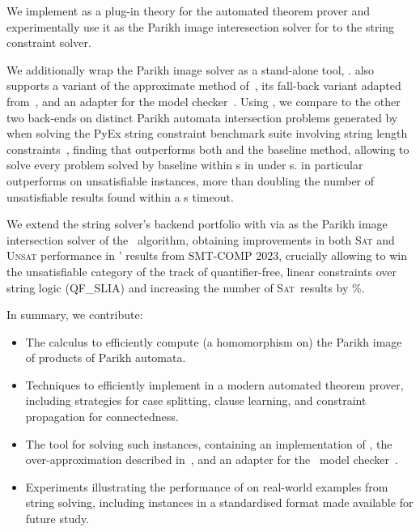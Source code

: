 We implement \Calculus{} as a plug-in theory for the \Princess{} automated
theorem prover and experimentally use it as the Parikh image interesection solver for
to the \Ostrich{} string constraint solver.

We additionally wrap the Parikh image solver as a stand-alone tool, \Catra{}.
\Catra{} also supports a variant of the approximate method of~\cite{approximate-parikh}, its fall-back variant adapted
from~\cite{generate-parikh-image}, and an adapter for the \Nuxmv{} model
checker~\cite{nuxmv}. Using \Catra, we compare \Calculus{} to the other two
back-ends on \NrBenchmarks{} distinct Parikh automata intersection problems
generated by \OstrichPlus{} when solving the PyEx string constraint benchmark
suite involving string length constraints~\cite{pyex}, finding that \Calculus{}
outperforms both \Nuxmv{} and the baseline method, allowing \Calculus{}
to solve every problem solved by baseline within s in under s.
\Calculus{} in particular outperforms \Nuxmv{} on unsatisfiable instances, more than 
doubling the number of unsatisfiable results found within a s timeout.

We extend the \Ostrich{} string solver's backend portfolio with \Calculus{} via
\Catra{} as the Parikh image intersection solver of the \OstrichPlus{}~algorithm,
obtaining improvements in both \textsc{Sat}  and \textsc{Unsat} performance in
\Ostrich{}' results from SMT-COMP 2023, crucially allowing \Ostrich{} to win
the unsatisfiable category of the track of quantifier-free, linear constraints
over string logic (QF\_SLIA) and increasing the number of \textsc{Sat}~results
by \%.



In summary, we contribute:
\begin{itemize}
    \item The \Calculus{} calculus to efficiently compute (a homomorphism on)
          the Parikh image of products of Parikh automata.
    \item Techniques to efficiently implement \Calculus{} in a modern
    automated theorem prover, including strategies for case splitting, clause
    learning, and constraint propagation for connectedness.
    \item The \Catra{} tool for solving such instances, containing an
    implementation of \Calculus{}, the over-approximation described
    in~\cite{approximate-parikh}, and an adapter for the~\Nuxmv{} model
    checker~\cite{nuxmv}.
    \item Experiments illustrating the performance of \Calculus{} on real-world
    examples from string solving, including \NrBenchmarks{} instances in a
    standardised format made available for future study.
\end{itemize}

